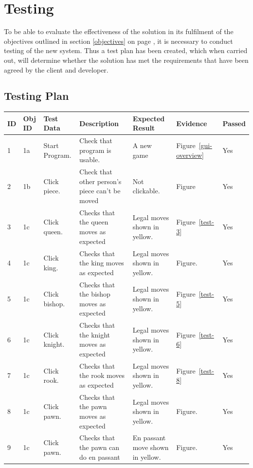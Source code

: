 \documentclass[twoside, 12pt]{report}
\begin{document}
\chapter{Testing}
To be able to evaluate the effectiveness of the solution in its fulfilment of the objectives outlined in section \ref{objectives} on page \pageref{objectives}, it is necessary to conduct testing of the new system. Thus a test plan has been created, which when carried out, will determine whether the solution has met the requirements that have been agreed by the client and developer.
\section{Testing Plan}
\footnotesize
\begin{longtable}{|p{}|p{}|p{}|p{}|p{}|p{}|p{}|}
\hline
\textbf{ID} & \textbf{Obj ID} & \textbf{Test Data} & \textbf{Description} & \textbf{Expected Result} & \textbf{Evidence} & \textbf{Passed}\\ \hline
1 & 1a & Start Program. & Check that program is usable. & A new game & Figure~\ref{gui-overview} & Yes \\ \hline
2 & 1b & Click piece. & Check that other person's piece can't be moved & Not clickable. & Figure & Yes \\ \hline
3 & 1c & Click queen. & Checks that the queen moves as expected & Legal moves shown in yellow. & Figure~\ref{test-3} & Yes \\ \hline
4 & 1c & Click king. & Checks that the king moves as expected & Legal moves shown in yellow. & Figure. & Yes \\ \hline
5 & 1c & Click bishop. & Checks that the bishop moves as expected & Legal moves shown in yellow. & Figure~\ref{test-5} & Yes \\ \hline
6 & 1c & Click knight. & Checks that the knight moves as expected & Legal moves shown in yellow. & Figure~\ref{test-6} & Yes \\ \hline
7 & 1c & Click rook. & Checks that the rook moves as expected & Legal moves shown in yellow. & Figure~\ref{test-8} & Yes \\ \hline
8 & 1c & Click pawn. & Checks that the pawn moves as expected & Legal moves shown in yellow. & Figure. & Yes \\ \hline
9 & 1c & Click pawn. & Checks that the pawn can do en passant & En passant move shown in yellow. & Figure. & Yes \\ \hline

\end{longtable}
\end{document}
